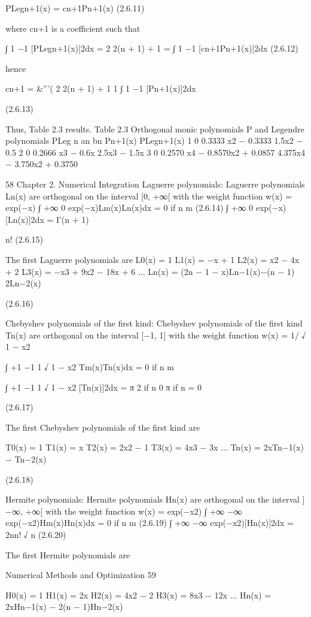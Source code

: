 \documentclass[letterpaper,12pt]{article}
\begin{document}
PLegn+1(x) = cn+1Pn+1(x) (2.6.11)

where cn+1 is a coefficient such that

∫ 1
−1
[PLegn+1(x)]2dx = 2
2(n + 1) + 1 =
∫ 1
−1
[cn+1Pn+1(x)]2dx (2.6.12)

hence

cn+1 =
&'''(
2
2(n + 1) + 1
1
∫ 1
−1
[Pn+1(x)]2dx

(2.6.13)

Thus, Table 2.3 results.
Table 2.3 Orthogonal monic polynomials P and Legendre polynomials PLeg
n an bn Pn+1(x) PLegn+1(x)
1 0 0.3333 x2 − 0.3333 1.5x2 − 0.5
2 0 0.2666 x3 − 0.6x 2.5x3 − 1.5x
3 0 0.2570 x4 − 0.8570x2 + 0.0857 4.375x4 − 3.750x2 + 0.3750

58 Chapter 2. Numerical Integration
Laguerre polynomials:
Laguerre polynomials Ln(x) are orthogonal on the interval [0, +∞[ with the weight
function w(x) = exp(−x)
∫ +∞
0
exp(−x)Lm(x)Ln(x)dx = 0 if n  m (2.6.14)
∫ +∞
0
exp(−x)[Ln(x)]2dx = Γ(n + 1)

n! (2.6.15)

The first Laguerre polynomials are
L0(x) = 1
L1(x) = −x + 1
L2(x) = x2 − 4x + 2
L3(x) = −x3 + 9x2 − 18x + 6
...
Ln(x) = (2n − 1 − x)Ln−1(x)−(n − 1)
2Ln−2(x)

(2.6.16)

Chebyshev polynomials of the first kind:
Chebyshev polynomials of the first kind Tn(x) are orthogonal on the interval [−1, 1]
with the weight function w(x) = 1/
√
1 − x2

∫ +1
−1
1
√
1 − x2
Tm(x)Tn(x)dx = 0 if n  m

∫ +1
−1
1
√
1 − x2
[Tn(x)]2dx =
 π
2 if n  0
π if n = 0

(2.6.17)

The first Chebyshev polynomials of the first kind are

T0(x) = 1
T1(x) = x
T2(x) = 2x2 − 1
T3(x) = 4x3 − 3x
...
Tn(x) = 2xTn−1(x) − Tn−2(x)

(2.6.18)

Hermite polynomials:
Hermite polynomials Hn(x) are orthogonal on the interval ]−∞, +∞[ with the
weight function w(x) = exp(−x2)
∫ +∞
−∞
exp(−x2)Hm(x)Hn(x)dx = 0 if n  m (2.6.19)
∫ +∞
−∞
exp(−x2)[Hn(x)]2dx = 2nn!
√
n (2.6.20)

The first Hermite polynomials are

Numerical Methods and Optimization 59

H0(x) = 1
H1(x) = 2x
H2(x) = 4x2 − 2
H3(x) = 8x3 − 12x
...
Hn(x) = 2xHn−1(x) − 2(n − 1)Hn−2(x)
\end{document}
